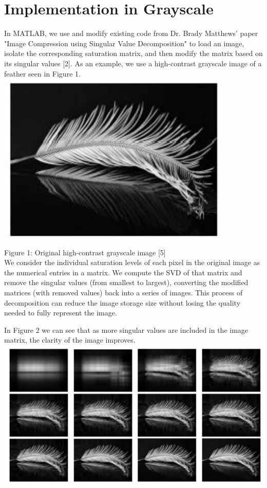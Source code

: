\documentclass[10pt]{article}
\begin{document}
\section*{Implementation in Grayscale}
In MATLAB, we use and modify existing code from Dr. Brady Matthews' paper "Image Compression using Singular Value Decomposition" to load an image, isolate the corresponding saturation matrix, and then modify the matrix based on its singular values [2]. As an example, we use a high-contrast grayscale image of a feather seen in Figure 1.\\
\includegraphics[max width=\textwidth, center]{2025_04_09_7d70d965b908bc4c1892g-3}

Figure 1: Original high-contrast grayscale image [5]\\
We consider the individual saturation levels of each pixel in the original image as the numerical entries in a matrix. We compute the SVD of that matrix and remove the singular values (from smallest to largest), converting the modified matrices (with removed values) back into a series of images. This process of decomposition can reduce the image storage size without losing the quality needed to fully represent the image.

In Figure 2 we can see that as more singular values are included in the image matrix, the clarity of the image improves.\\
\includegraphics[max width=\textwidth, center]{2025_04_09_7d70d965b908bc4c1892g-3(1)}
\end{document}
